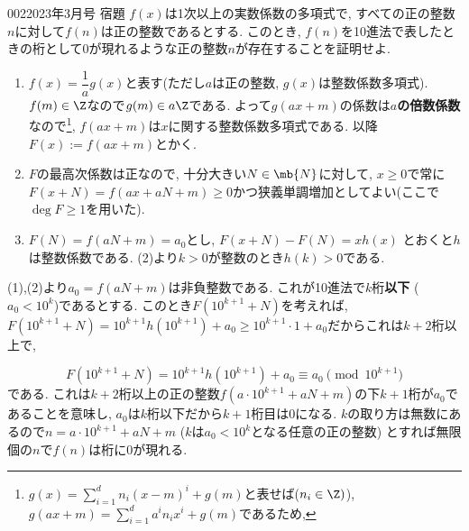 \begin{prob}{002}{}{2023年3月号 宿題}
 $f(x)$は1次以上の実数係数の多項式で, すべての正の整数$n$に対して$f(n)$は正の整数であるとする. このとき, $f(n)$を10進法で表したときの桁として$0$が現れるような正の整数$n$が存在することを証明せよ.
\end{prob}

 \begin{enumerate}
        \item $f(x) = \dfrac{1}{a} g(x)$と表す(ただし$a$は正の整数, $g(x)$は整数係数多項式). $f(m)\in \Z$なので$g(m) \in a\Z$である. よって$g(ax + m)$の係数は\textbf{$a$の倍数係数}なので\footnote{$g(x) = \sum_{i=1}^{d} n_i (x-m)^{i} + g(m)$と表せば($n_i\in \Z )$), $g(ax + m) = \sum_{i=1}^{d}a^i n_i x^i+ g(m)$であるため, }, $f(ax + m)$は$x$に関する整数係数多項式である. 以降$F(x):= f(ax+m)$とかく.
        \item $F$の最高次係数は正なので, 十分大きい$N\in\mb{N}$に対して, $x\geq 0$で常に$F(x+N) = f(ax + aN + m) \geq 0$かつ狭義単調増加としてよい(ここで$\deg{F} \geq 1$を用いた).
        \item $F(N) = f(aN + m) = a_0$とし, $F(x+N) - F(N) = xh(x)$ とおくと$h$は整数係数である. (2)より$k>0$が整数のとき$h(k) > 0$である.

    \end{enumerate}
      (1),(2)より$a_0 = f(aN + m)$は非負整数である. これが10進法で$k$桁\textbf{以下} ($a_0 < 10^{k}$)であるとする. このとき$F(10^{k+1} + N)$を考えれば, $F(10^{k+1} + N) = 10^{k+1}h(10^{k+1}) + a_0 \geq 10^{k+1}\cdot 1 + a_0$だからこれは$k+2$桁以上で,

 \[
 F(10^{k+1} + N) =  10^{k+1} h(10^{k+1}) + a_0 \equiv a_0 \pmod{10^{k+1}}
 \]
 である. これは$k+2$桁以上の正の整数$f(a\cdot 10^{k+1} + aN + m)$の下$k+1$桁が$a_0$であることを意味し, $a_0$は$k$桁以下だから$k+1$桁目は0になる. $k$の取り方は無数にあるので$n = a\cdot 10^{k+1} + aN + m$ ($k$は$a_0 < 10^k$となる任意の正の整数) とすれば無限個の$n$で$f(n)$は桁に0が現れる.
